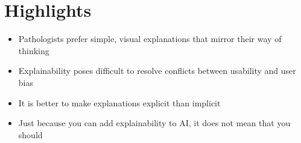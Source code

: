 \section*{\textbf{Highlights}}

\begin{itemize}
    \item Pathologists prefer simple, visual explanations that mirror their way of thinking
    \item Explainability poses difficult to resolve conflicts between usability and user bias
    \item It is better to make explanations explicit than implicit
    \item Just because you can add explainability to AI, it does not mean that you should
\end{itemize}
